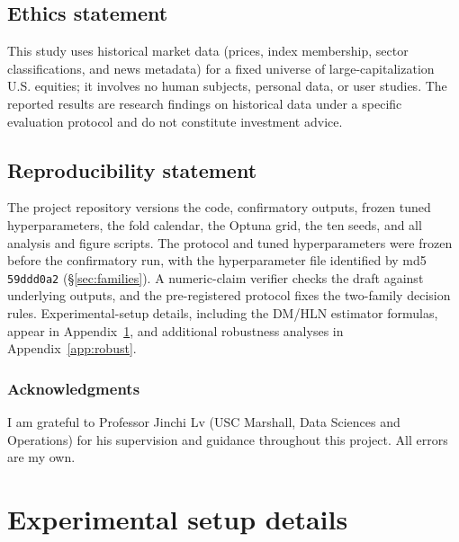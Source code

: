 \documentclass{article}
\begin{document}
\subsection*{Ethics statement}
This study uses historical market data (prices, index membership, sector classifications, and news metadata) for a fixed universe of large-capitalization U.S. equities; it involves no human subjects, personal data, or user studies. The reported results are research findings on historical data under a specific evaluation protocol and do not constitute investment advice.

\subsection*{Reproducibility statement}
The project repository versions the code, confirmatory outputs, frozen tuned hyperparameters, the fold calendar, the Optuna grid, the ten seeds, and all analysis and figure scripts. The protocol and tuned hyperparameters were frozen before the confirmatory run, with the hyperparameter file identified by md5 \texttt{59ddd0a2} (\S\ref{sec:families}). A numeric-claim verifier checks the draft against underlying outputs, and the pre-registered protocol fixes the two-family decision rules. Experimental-setup details, including the DM/HLN estimator formulas, appear in Appendix~\ref{app:setup}, and additional robustness analyses in Appendix~\ref{app:robust}.

\ificlrfinal
\subsubsection*{Acknowledgments}
I am grateful to Professor Jinchi Lv (USC Marshall, Data Sciences and Operations) for his supervision and guidance throughout this project. All errors are my own.
\fi




\appendix
\section{Experimental setup details}\label{app:setup}
\end{document}
